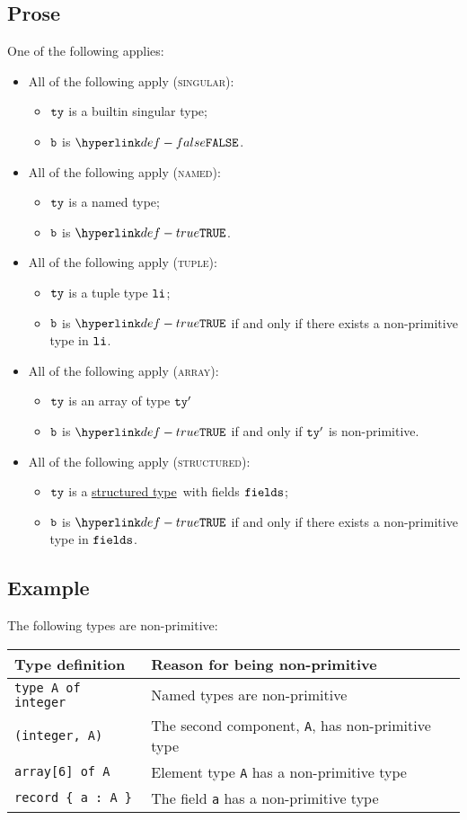 \documentclass{book}
\newcommand\structuredtype[0]{\hyperlink{def-structuredtype}{structured type}}
\begin{document}
\subsection{Prose}
One of the following applies:
\begin{itemize}
  \item All of the following apply (\textsc{singular}):
  \begin{itemize}
  \item $\texttt{ty}$ is a builtin singular type;
  \item $\texttt{b}$ is $\False$.
  \end{itemize}
  \item All of the following apply (\textsc{named}):
  \begin{itemize}
    \item $\texttt{ty}$ is a named type;
    \item $\texttt{b}$ is $\True$.
  \end{itemize}
  \item All of the following apply (\textsc{tuple}):
  \begin{itemize}
    \item $\texttt{ty}$ is a tuple type $\texttt{li}$;
    \item $\texttt{b}$ is $\True$ if and only if there exists a non-primitive type in $\texttt{li}$.
  \end{itemize}
  \item All of the following apply (\textsc{array}):
    \begin{itemize}
    \item $\texttt{ty}$ is an array of type $\texttt{ty}'$
    \item $\texttt{b}$ is $\True$ if and only if $\texttt{ty}'$ is non-primitive.
    \end{itemize}
  \item All of the following apply (\textsc{structured}):
    \begin{itemize}
    \item $\texttt{ty}$ is a \structuredtype\ with fields $\texttt{fields}$;
    \item $\texttt{b}$ is $\True$ if and only if there exists a non-primitive type in $\texttt{fields}$.
    \end{itemize}
\end{itemize}

\subsection{Example}
The following types are non-primitive:

\begin{tabular}{ll}
\textbf{Type definition} & \textbf{Reason for being non-primitive}\\
\hline
\texttt{type A of integer}  & Named types are non-primitive\\
\texttt{(integer, A)}       & The second component, \texttt{A}, has non-primitive type\\
\texttt{array[6] of A}      & Element type \texttt{A} has a non-primitive type\\
\verb|record { a : A }|     & The field \texttt{a} has a non-primitive type
\end{tabular}
\end{document}
